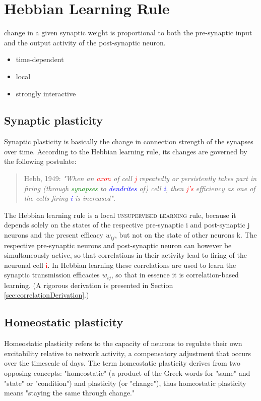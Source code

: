 \documentclass[11pt]{article}
\begin{document}
\section{Hebbian Learning Rule}
change in a given synaptic weight is proportional to both the pre-synaptic input and the output activity of the post-synaptic neuron.
\begin{itemize}
\item time-dependent
\item local
\item strongly interactive
\end{itemize}
\subsection{Synaptic plasticity}
Synaptic plasticity is basically the change in connection strength of the synapses over time. According to the Hebbian learning rule, its changes are governed by the following postulate:
\begin{quote}{Hebb, 1949:}
\textit{"When an \textcolor{red}{axon} of cell \textcolor{red}{j} repeatedly or persistently takes part in firing (through \textcolor{green}{synapses} to \textcolor{blue}{dendrites} of) cell \textcolor{blue}{i}, then \textcolor{red}{j's} efficiency as one of the cells firing \textcolor{blue}{i} is increased"}.
\end{quote}
The Hebbian learning rule is a local \textsc{unsupervised learning} rule, because it depends solely on the states of the respective pre-synaptic i and post-synaptic j neurons and the present efficacy $w_{ij}$, but not on the state of other neurons k. The respective pre-synaptic neurons and post-synaptic neuron can however be simultaneously active, so that correlations in their activity lead to firing of the neuronal cell \textcolor{red}{i}. In Hebbian learning these correlations are used to learn the synaptic transmission efficacies $w_{ij}$, so that in essence it is correlation-based learning. (A rigorous derivation is presented in Section \ref{sec:correlationDerivation}.)

\subsection{Homeostatic plasticity}
Homeostatic plasticity refers to the capacity of neurons to regulate their own excitability relative to network activity, a compensatory adjustment that occurs over the timescale of days. The term homeostatic plasticity derives from two opposing concepts: "homeostatic" (a product of the Greek words for "same" and "state" or "condition") and plasticity (or "change"), thus homeostatic plasticity means "staying the same through change."
\end{document}
